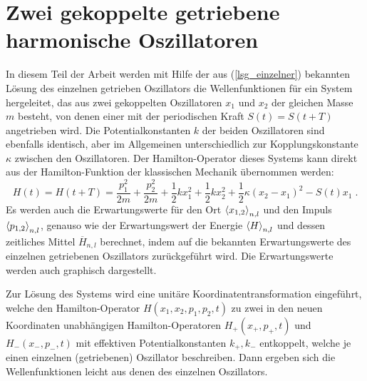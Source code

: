 \chapter{Zwei gekoppelte getriebene harmonische Oszillatoren}
\label{4}

In diesem Teil der Arbeit werden mit Hilfe der aus (\ref{lsg_einzelner}) bekannten Lösung des einzelnen getrieben Oszillators die Wellenfunktionen für ein System hergeleitet, das aus zwei gekoppelten Oszillatoren $x_1$ und $x_2$ der gleichen Masse $m$ besteht, von denen einer mit der periodischen Kraft $S(t) = S(t+T)$ angetrieben wird.
Die Potentialkonstanten $k$ der beiden Oszillatoren sind ebenfalls identisch, aber im Allgemeinen unterschiedlich zur Kopplungskonstante $\kappa$ zwischen den Oszillatoren.
Der Hamilton-Operator dieses Systems kann direkt aus der Hamilton-Funktion  der klassischen Mechanik übernommen werden:
\begin{equation}
  H(t) = H(t+T) = \frac{p_1^2}{2m} + \frac{p_2^2}{2m} + \frac 1 2 kx_1^2 + \frac 1 2 kx_2^2 + \frac 1 2 \kappa(x_2-x_1)^2 - S(t)x_1 \; .
  \label{H_gekoppelt}
\end{equation}
Es werden auch die Erwartungswerte für  den Ort $\braket{x_{1,2}}_{n,l}$ und den Impuls $\braket{p_{1,2}}_{n,l}$, genauso wie der Erwartungswert der Energie $\braket{H}_{n,l}$ und dessen zeitliches Mittel $\overline{H}_{n,l}$ berechnet, indem auf die bekannten Erwartungswerte des einzelnen getriebenen Oszillators zurückgeführt wird.
Die Erwartungswerte werden auch graphisch dargestellt.

Zur Lösung des Systems wird eine unitäre Koordinatentransformation eingeführt, welche den Hamilton-Operator $H(x_1,x_2,p_1,p_2,t)$ zu zwei in den neuen Koordinaten unabhängigen Hamilton-Operatoren $H_+(x_+,p_+,t)$ und $H_-(x_-,p_-,t)$ mit effektiven Potentialkonstanten $k_+,k_-$ entkoppelt, welche je einen einzelnen (getriebenen) Oszillator beschreiben.
Dann ergeben sich die Wellenfunktionen leicht aus denen des einzelnen Oszillators.


